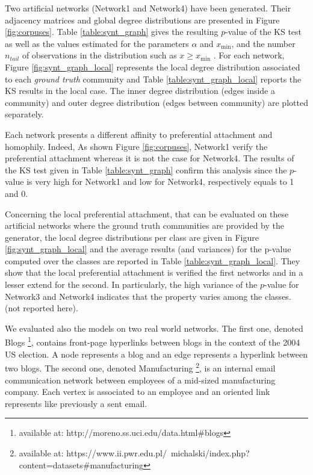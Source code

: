 Two artificial networks (Network1 and Network4) have been generated. Their adjacency matrices and global degree distributions are presented in Figure \ref{fig:corpuses}. Table \ref{table:synt_graph} gives the resulting $p$-value of the KS test as well as the  values estimated for the parameters  $\alpha$ and $x_\text{min}$,  and  the number $n_{tail}$ of observations in the distribution such as $x \geq x_\text{min}$ . For each network, Figure \ref{fig:synt_graph_local} represents the local degree distribution associated to each \emph{ground truth} community and Table \ref{table:synt_graph_local} reports the KS results in the local case. The inner degree distribution (edges inside a community) and outer degree distribution (edges between community) are plotted separately.

Each network presents a different affinity to preferential attachment and homophily.
Indeed, As shown Figure \ref{fig:corpuses}, Network1 verify the  preferential attachment whereas it is not the case for Network4. The results of the KS test given in Table \ref{table:synt_graph} confirm this analysis since the $p$-value is very high for Network1 and low for Network4, respectively equals to 1 and 0.

Concerning the local preferential attachment, that can be evaluated on these artificial networks where the ground truth communities are provided by the generator, the local degree distributions per class are given in Figure \ref{fig:synt_graph_local} and the average results (and variances) for the p-value computed over the classes are reported in Table \ref{table:synt_graph_local}. They show that the local preferential attachment is verified the first networks and in a lesser extend for the second. In particularly, the high variance of the $p$-value for Network3 and Network4 indicates that the property varies among the classes. (not reported here).

We evaluated also the models on two real world networks.
The first one, denoted Blogs \footnote{available at: http://moreno.ss.uci.edu/data.html\#blogs}, contains front-page hyperlinks between blogs in the context of the 2004 US election. A node represents a blog and an edge represents a hyperlink between two blogs.
The second one, denoted Manufacturing \footnote{available at: https://www.ii.pwr.edu.pl/~michalski/index.php?content=datasets\#manufacturing}, is an internal email communication network between employees of a mid-sized manufacturing company. Each vertex is associated  to an employee and an oriented link represents like previously a sent email.

